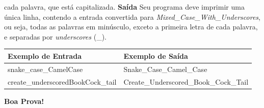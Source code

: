 \documentclass[a4paper, 12pt]{article}
\begin{document}
cada palavra, que está capitalizada.
\newline \newline
\textbf{{\large Saída}} \newline
Seu programa deve imprimir uma única linha, contendo a entrada convertida para
\textit{Mixed\_Case\_With\_Underscores}, ou seja, todas as palavras em minúsculo, exceto
a primeira letra de cada palavra, e separadas por \textit{underscores} (\_).
\newline
\begin{table}[H]
\centering
\begin{tabular}{|l|l|}
\hline
\textbf{Exemplo de Entrada}       & \textbf{Exemplo de Saída}             \\ \hline
snake\_case\_CamelCase            & Snake\_Case\_Camel\_Case              \\ \hline
create\_underscoredBookCock\_tail & Create\_Underscored\_Book\_Cock\_Tail \\ \hline
\end{tabular}
\end{table}
\flushright
\textbf{\Large Boa Prova!}
\end{document}

